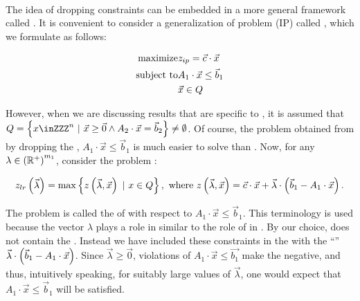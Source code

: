 \paragraph{}
The idea of dropping constraints can be embedded in a more general framework called . It is convenient to consider a generalization of problem (IP) called , which we formulate as follows:

\begin{eqnarray}
\mbox{maximize}&z_{ip}=\vec{c}\cdot\vec{x}\eqnlab{lagrageb-m}\\
\mbox{subject to}&A_1\cdot\vec{x}\leq\vec{b}_1\eqnlab{lagrageb-c1}\\
&\vec{x}\in Q\eqnlab{lagrageb-c2}
\end{eqnarray}

However, when we are discussing results that are specific to , it is assumed that $Q=\condset{x\inZZZ^n}{\vec{x}\geq\vec{0}\wedge A_2\cdot\vec{x}=\vec{b}_2}\neq\emptyset$. Of course, the problem obtained from  by dropping the , $A_1\cdot\vec{x}\leq\vec{b}_1$ is much easier to solve than . Now, for any $\lambda\in\left( \mathbb{R}^+ \right)^{m_1}$, consider the problem :

\begin{equation}
z_{lr}\left( \vec{\lambda} \right)=\max\left\{ z\left( \vec{\lambda},\vec{x} \right)\ |\ x\in Q \right\},\mbox{ where }z\left( \vec{\lambda},\vec{x} \right)=\vec{c}\cdot\vec{x}+\vec{\lambda}\cdot\left( \vec{b}_1-A_1\cdot\vec{x} \right).
\end{equation}

The problem  is called the  of  with respect to $A_1\cdot\vec{x}\leq\vec{b}_1$. This terminology is used because the vector $\lambda$ plays a role in  similar to the role of  in . By our choice,  does not contain the . Instead we have included these constraints in the  with the ``'' $\vec{\lambda}\cdot\left( \vec{b}_1-A_1\cdot\vec{x} \right)$. Since $\vec{\lambda}\geq\vec{0}$, violations of $A_1\cdot\vec{x}\leq\vec{b_1}$ make the  negative, and thus, intuitively speaking, for suitably large values of $\vec{\lambda}$, one would expect that $A_1\cdot\vec{x}\leq\vec{b}_1$ will be satisfied.

